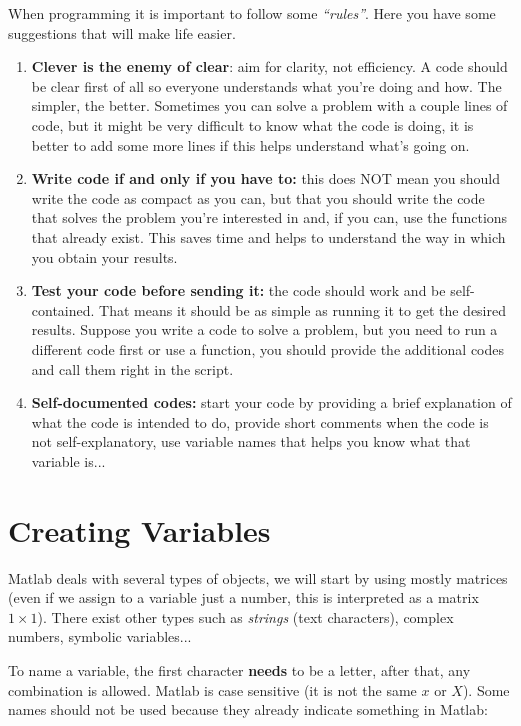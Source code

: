 \documentclass[a4paper,11pt]{article}
\begin{document}
When programming it is important to follow some \textit{``rules''}. Here you have some suggestions that will make life easier. 

\begin{enumerate}
	\item \textbf{Clever is the enemy of clear}: aim for clarity, not efficiency. A code should be clear first of all so everyone understands what you're doing and how. The simpler, the better. Sometimes you can solve a problem with a couple lines of code, but it might be very difficult to know what the code is doing, it is better to add some more lines if this helps understand what's going on.
	\item \textbf{Write code if and only if you have to:} this does NOT mean you should write the code as compact as you can, but that you should write the code that solves the problem you're interested in and, if you can, use the functions that already exist. This saves time and helps to understand the way in which you obtain your results.
	\item \textbf{Test your code before sending it:} the code should work and be self-contained. That means it should be as simple as running it to get the desired results. Suppose you write a code to solve a problem, but you need to run a different code first or use a function, you should provide the additional codes and call them right in the script.
	\item \textbf{Self-documented codes:} start your code by providing a brief explanation of what the code is intended to do, provide short comments when the code is not self-explanatory, use variable names that helps you know what that variable is...
\end{enumerate}

\section{Creating Variables}

Matlab deals with several types of objects, we will start by using mostly matrices (even if we assign to a variable just a number, this is interpreted as a matrix $1\times 1$). There exist other types such as \textit{strings} (text characters), complex numbers, symbolic variables...

To name a variable, the first character \textbf{needs} to be a letter, after that, any combination is allowed. Matlab is case sensitive (it is not the same $x$ or $X$). Some names should not be used because they already indicate something in Matlab:
\end{document}
